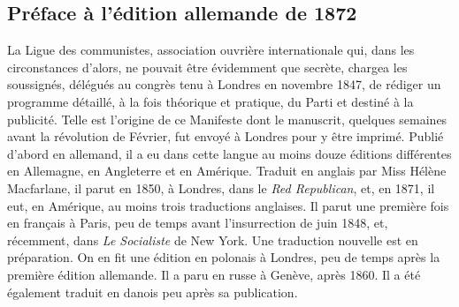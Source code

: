\documentclass[french,twoside]{book} %
\begin{document}
\subsection[Préface à l’édition allemande de 1872]{Préface à l’édition allemande de 1872}
\noindent La Ligue des communistes, association ouvrière internationale qui, dans les circonstances d’alors, ne pouvait être évidemment que secrète, chargea les soussignés, délégués au congrès tenu à Londres en novembre 1847, de rédiger un programme détaillé, à la fois théorique et pratique, du Parti et destiné à la publicité. Telle est l’origine de ce Manifeste dont le manuscrit, quelques semaines avant la révolution de Février, fut envoyé à Londres pour y être imprimé. Publié d’abord en allemand, il a eu dans cette langue au moins douze éditions différentes en Allemagne, en Angleterre et en Amérique. Traduit en anglais par Miss Hélène Macfarlane, il parut en 1850, à Londres, dans le \emph{Red Republican}, et, en 1871, il eut, en Amérique, au moins trois traductions anglaises. Il parut une première fois en français à Paris, peu de temps avant l’insurrection de juin 1848, et, récemment, dans \emph{Le Socialiste} de New York. Une traduction nouvelle est en préparation. On en fit une édition en polonais à Londres, peu de temps après la première édition allemande. Il a paru en russe à Genève, après 1860. Il a été également traduit en danois peu après sa publication.\par
\end{document}
